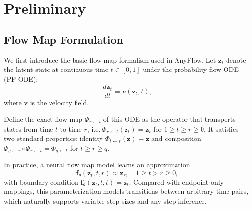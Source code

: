 \documentclass{llmxive}
\providecommand{\ie}{i.e.,\xspace}
\begin{document}
\section{Preliminary}
\label{sec:preliminary}

\subsection{Flow Map Formulation}

We first introduce the basic flow map formalism used in AnyFlow.
Let $\mathbf{z}_t$ denote the latent state at continuous time $t\in[0,1]$ under the probability-flow ODE (PF-ODE):
\begin{equation}
  \frac{d\mathbf{z}_t}{dt} = \mathbf{v}(\mathbf{z}_t, t),
\end{equation}
where $\mathbf{v}$ is the velocity field.

Define the exact flow map $\Phi_{r\leftarrow t}$ of this ODE as the operator that transports states from time $t$ to time $r$, \ie $\Phi_{r\leftarrow t}(\mathbf{z}_t)=\mathbf{z}_r$ for $1\ge t\ge r\ge 0$.
It satisfies two standard properties: identity $\Phi_{t\leftarrow t}(\mathbf{z})=\mathbf{z}$ and composition $\Phi_{q\leftarrow r}\circ\Phi_{r\leftarrow t}=\Phi_{q\leftarrow t}$ for $t\ge r\ge q$.

In practice, a neural flow map model learns an approximation
\begin{equation}
  \mathbf{f}_\theta(\mathbf{z}_t, t, r) \approx \mathbf{z}_r, \quad 1 \ge t > r \ge 0,
\end{equation}
with boundary condition $\mathbf{f}_\theta(\mathbf{z}_t,t,t)=\mathbf{z}_t$.
Compared with endpoint-only mappings, this parameterization models transitions between arbitrary time pairs, which naturally supports variable step sizes and any-step inference.
\end{document}
